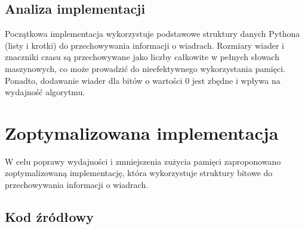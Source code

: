 \documentclass{article}
\begin{document}
\subsection{Analiza implementacji}

Początkowa implementacja wykorzystuje podstawowe struktury danych Pythona (listy i krotki) do przechowywania informacji o wiadrach. Rozmiary wiader i znaczniki czasu są przechowywane jako liczby całkowite w pełnych słowach maszynowych, co może prowadzić do nieefektywnego wykorzystania pamięci. Ponadto, dodawanie wiader dla bitów o wartości 0 jest zbędne i wpływa na wydajność algorytmu.

\section{Zoptymalizowana implementacja}

W celu poprawy wydajności i zmniejszenia zużycia pamięci zaproponowano zoptymalizowaną implementację, która wykorzystuje struktury bitowe do przechowywania informacji o wiadrach.

\subsection{Kod źródłowy}
\end{document}

